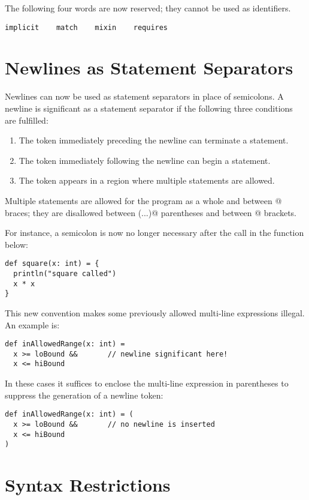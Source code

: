 \documentclass[a4paper,11pt,twoside]{article}
\begin{document}
The following four words are now reserved; they cannot be used as
identifiers.
\begin{lstlisting}
implicit    match    mixin    requires
\end{lstlisting}

\section{Newlines as Statement Separators}

Newlines can now be used as statement separators in place of
semicolons. A newline is significant as a statement separator if the
following three conditions are fulfilled:
\begin{enumerate}
\item
The token immediately preceding the newline can terminate a statement.
\item
The token immediately following the newline can begin a statement.
\item
The token appears in a region where multiple statements are allowed.
\end{enumerate}
Multiple statements are allowed for the program as a whole and between
@ braces; they are disallowed between \lstinline@(...)@
parentheses and between \lstinline@[...]@ brackets.

For instance, a semicolon is now no longer necessary after the
\lstinline@println@ call in the function below: 
\begin{lstlisting}
def square(x: int) = {
  println("square called")
  x * x
}
\end{lstlisting}
This new convention makes some previously allowed multi-line expressions illegal.  
An example is:
\begin{lstlisting}
def inAllowedRange(x: int) = 
  x >= loBound &&       // newline significant here!
  x <= hiBound
\end{lstlisting}
In these cases it suffices to enclose the multi-line expression in
parentheses to suppress the generation of a newline token:
\begin{lstlisting}
def inAllowedRange(x: int) = (
  x >= loBound &&       // no newline is inserted
  x <= hiBound
)
\end{lstlisting}


\section{Syntax Restrictions}
\end{document}
